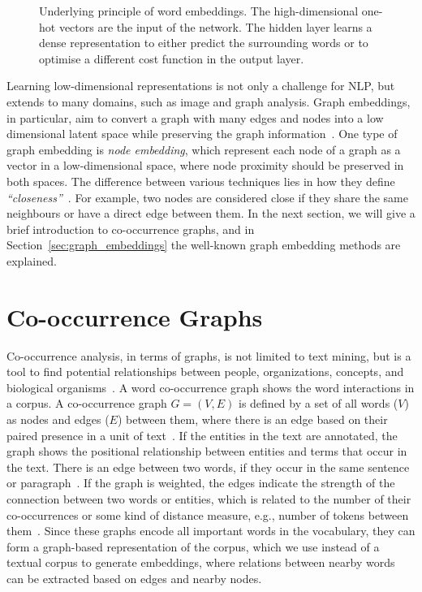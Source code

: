 \begin{figure}
\centering 
\resizebox{0.8\textwidth}{0.48\textwidth}{      

}
\caption{Underlying principle of word embeddings. The high-dimensional one-hot vectors are the input of the network. The hidden layer learns a dense representation to either predict the surrounding words or to optimise a different cost function in the output layer.}
\label{fig:emb}
\end{figure}
\noindent
Learning low-dimensional representations is not only a challenge for NLP, but extends to many domains, such as image and graph analysis. Graph embeddings, in particular,  aim to convert a graph with many edges and nodes into a low dimensional latent space while preserving the graph information~. One type of graph embedding is \emph{node embedding}, which represent each node of a graph as a vector in a low-dimensional space, where node proximity should be preserved in both spaces.
The difference between various techniques lies in how they define \emph{``closeness''}~. For example, two nodes are considered close if they share the same neighbours or have a direct edge between them. In the next section, we will give a brief introduction to co-occurrence graphs, and in Section~\ref{sec:graph_embeddings} the well-known graph embedding methods are explained.  

\section{Co-occurrence Graphs}
\label{sec:graph}
Co-occurrence analysis, in terms of graphs, is not limited to text mining, but is a tool to find potential relationships between people, organizations, concepts, and biological organisms~. A word co-occurrence graph shows the word interactions in a corpus. A co-occurrence graph $G=(V,E)$ is defined by a set of all words ($V$) as nodes and edges ($E$) between them, where there is an edge based on their paired presence in a unit of text~. If the entities in the text are annotated, the graph shows the positional relationship between entities and terms that occur in the text. There is an edge between two words, if they occur in the same sentence or paragraph~. If the graph is weighted, the edges indicate the strength of the connection between two words or entities, which is related to the number of their co-occurrences or some kind of distance measure, e.g., number of tokens between them~. Since these graphs encode all important words in the vocabulary, they can form a graph-based representation of the corpus, which we use instead of a textual corpus to generate embeddings, where relations between nearby words can be extracted based on edges and nearby nodes.\\

